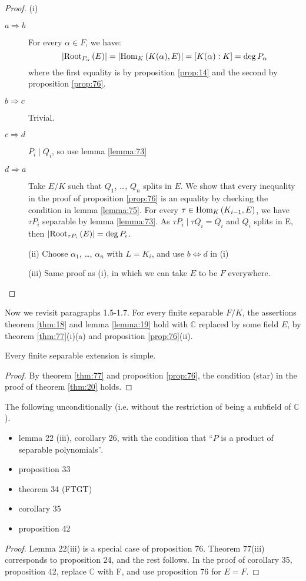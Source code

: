 \begin{proof}
  (i)
  \begin{description}
  \item[$a \Rightarrow b$] For every $\alpha \in F$, we have:
\[
\card{\rootset[P_\alpha]{E}} = \card{\homset{K(\alpha)}{E}} = [K(\alpha) : K] = \deg P_\alpha
\] where the first equality is by proposition \ref{prop:14} and the second by proposition \ref{prop:76}.
  \item[$b \Rightarrow c$] Trivial.
  \item[$c \Rightarrow d$] $P_i \mid Q_i$, so use lemma \ref{lemma:73}
  \item[$d \Rightarrow a$] Take $E/K$ such that $Q_1$, \ldots, $Q_n$ splits in $E$. We show that every inequality in the proof of proposition \ref{prop:76} is an equality by checking the condition in lemma \ref{lemma:75}. For every $\tau \in \homset{K_{i-1}}{E}$, we have $\tau{}P_i$ separable by lemma \ref{lemma:73}. As $\tau{}P_i \mid \tau{}Q_i = Q_i$ and $Q_i$ splits in E, then $\card{\rootset[\tau{}P_i]{E}} = \deg P_i$.

(ii)
Choose $\alpha_1$, \ldots, $\alpha_n$ with $L = K_i$, and use $b \Leftrightarrow d$ in (i)

(iii) Same proof as (i), in which we can take $E$ to be $F$ everywhere.
  \end{description}
\end{proof}
Now we revisit paragraphs 1.5-1.7. For every finite separable $F/K$, the assertions theorem \ref{thm:18} and lemma \ref{lemma:19} hold with $\mathbb{C}$ replaced by some field $E$, by theorem \ref{thm:77}(i)(a) and proposition \ref{prop:76}(ii).

\begin{theorem}
\label{thm:78}
  Every finite separable extension is simple.
\end{theorem}
\begin{proof}
  By theorem \ref{thm:77} and proposition \ref{prop:76}, the condition (star) in the proof of theorem \ref{thm:20} holds.
\end{proof}

\begin{proposition}
  \label{prop:79}
  The following unconditionally (i.e. without the restriction of being a subfield of $\mathbb{C}$).
  \begin{itemize}
  \item lemma 22 (iii), corollary 26, with the condition that ``$P$ is a product of separable polynomials''.
  \item proposition 33
  \item theorem 34 (FTGT)
  \item corollary 35
  \item proposition 42
  \end{itemize}
\end{proposition}
\begin{proof}
  Lemma 22(iii) is a special case of proposition 76. Theorem 77(iii) corresponds to proposition 24, and the rest follows. In the proof of corollary 35, proposition 42, replace $\mathbb{C}$ with F, and use proposition 76 for $E = F$.
\end{proof}

